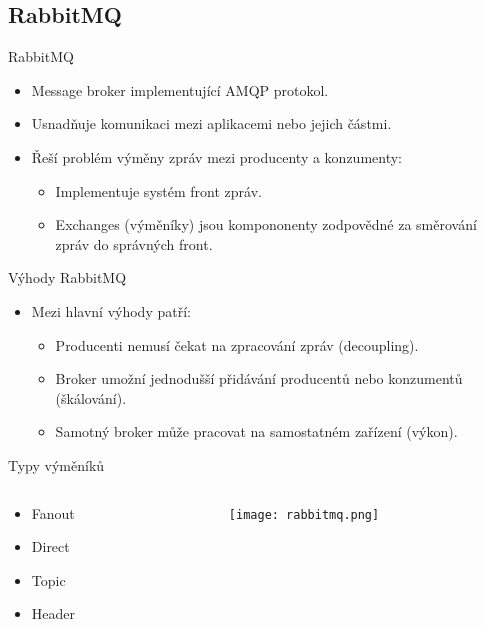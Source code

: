 \documentclass{beamer}
\begin{document}
\subsection{RabbitMQ}
\begin{frame}{RabbitMQ}
	\begin{itemize}
		\item Message broker implementující AMQP protokol.
		\item Usnadňuje komunikaci mezi aplikacemi nebo jejich částmi.
		\item Řeší problém výměny zpráv mezi producenty a konzumenty:
		\begin{itemize}
			\item [\textendash] Implementuje systém front zpráv.
			\item [\textendash] Exchanges (výměníky) jsou kompononenty zodpovědné za směrování zpráv 					  do správných front.
		\end{itemize}
	\end{itemize}

\end{frame}

\begin{frame}{Výhody RabbitMQ}
	\begin{itemize}
		\item Mezi hlavní výhody patří:
			\begin{itemize}
				\item [\textendash] Producenti nemusí čekat na zpracování zpráv (decoupling).
				\item [\textendash] Broker umožní jednodušší přidávání producentů nebo											  konzumentů (škálování).
				\item [\textendash] Samotný broker může pracovat na samostatném zařízení (výkon).
			\end{itemize}
	\end{itemize}
\end{frame}

\begin{frame}{Typy výměníků}
	\begin{columns}
    \begin{column}{0.2\textwidth}
      \begin{itemize}
        \item Fanout
        \item Direct
        \item Topic
        \item Header
      \end{itemize}
    \end{column}
    
    \begin{column}{0.8\textwidth}
      \centering
      \texttt{[image: rabbitmq.png]}
    \end{column}
  \end{columns}
\end{frame}
\end{document}
